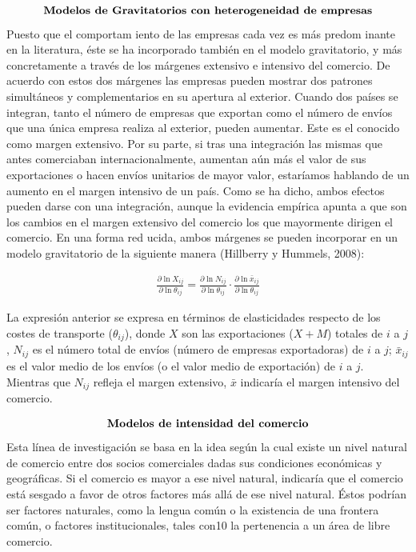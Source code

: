 \documentclass[10pt,a4paper]{article}
\begin{document}
$$\text{\textbf{Modelos de Gravitatorios con heterogeneidad de empresas}}$$
Puesto que el comportam iento de las empresas cada vez es más predom inante en la literatura, éste se ha incorporado también en el modelo gravitatorio, y más concretamente a través de los márgenes extensivo e intensivo del comercio. De acuerdo con estos dos márgenes las empresas pueden mostrar dos patrones simultáneos y complementarios en su apertura al exterior. Cuando dos países se integran, tanto el número de empresas que exportan como el número de envíos que una única empresa realiza al exterior, pueden aumentar. Este es el conocido como margen extensivo. Por su parte, si tras una integración las mismas que antes comerciaban internacionalmente, aumentan aún más el valor de sus exportaciones o hacen envíos unitarios de mayor valor, estaríamos hablando de un aumento en el margen intensivo de un país. Como se ha dicho, ambos efectos pueden darse con una integración, aunque la evidencia empírica apunta a que son los cambios en el margen extensivo del comercio los que mayormente dirigen el comercio. En una forma red ucida, ambos márgenes se pueden incorporar en un modelo gravitatorio de la siguiente manera (Hillberry y Hummels, 2008):

$$\begin{aligned}
    \frac{\partial \ln X_{ij}}{\partial \ln\theta_{ij}}=\frac{\partial\ln N_{ij}}{\partial \ln\theta_{ij}}\cdot\frac{\partial\ln\bar{x}_{ij}}{\partial\ln{\theta_{ij}}}
\end{aligned}$$

La expresión anterior se expresa en términos de elasticidades respecto de los costes de transporte ($\theta_{ij}$), donde $X$ son las exportaciones ($X+M$) totales de $i$ a $j$, $N_{ij}$ es el número total de envíos (número de empresas exportadoras) de $i$ a $j$; $\bar{x}_{ij}$ es el valor medio de los envíos (o el valor medio de exportación) de $i$ a $j$. Mientras que $N_{ij}$ refleja el margen extensivo, $\bar{x}$ indicaría el margen intensivo del comercio.

$$\text{\textbf{Modelos de intensidad del comercio}}$$ 
Esta línea de investigación se basa en la idea según la cual existe un nivel natural de comercio entre dos socios comerciales dadas sus condiciones económicas y geográficas. Si el comercio es mayor a ese nivel natural, indicaría que el comercio está sesgado a favor de otros factores más allá de ese nivel natural. Éstos podrían ser factores naturales, como la lengua común o la existencia de una frontera común, o factores institucionales, tales con10 la pertenencia a un área de libre comercio. 
\end{document}
